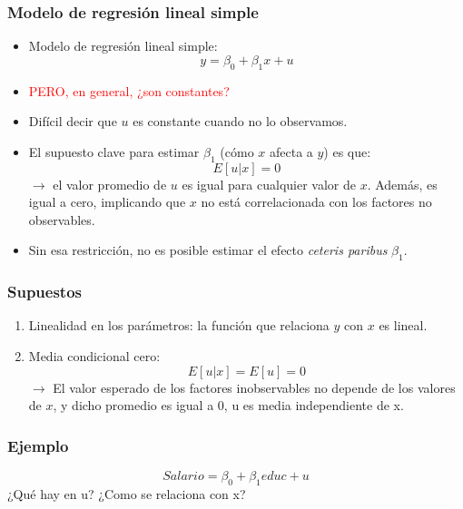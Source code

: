 \documentclass{beamer}
\begin{document}
\begin{frame}
	\frametitle{Modelo de regresión lineal simple} %
    \begin{itemize}
        \item Modelo de regresión lineal simple:
        \begin{equation}
            y = \beta_0 + \beta_1 x + u \tag{2}
        \end{equation}
        \item \textcolor{red}{PERO, en general, ¿son constantes?}
        \item Difícil decir que $u$ es constante cuando no lo observamos.
        \item El supuesto clave para estimar $\beta_1$ (cómo $x$ afecta a $y$) es que:
        \begin{equation*}
            E[u|x] = 0
        \end{equation*}
        $\rightarrow$ el valor promedio de $u$ es igual para cualquier valor de $x$. Además, es igual a cero, implicando que $x$ no está correlacionada con los factores no observables.
         \item Sin esa restricción, no es posible estimar el efecto \textit{ceteris paribus} $\beta_1$.
    \end{itemize}
\end{frame}
\begin{frame}
	\frametitle{Supuestos} %
\begin{enumerate}
  \item Linealidad en los parámetros: la función que relaciona $y$ con $x$ es lineal.
  \item Media condicional cero: 
  \begin{equation*}
  E[u|x] = E[u] = 0
  \end{equation*}  
  $\rightarrow$ El valor esperado de los factores inobservables no depende de los valores de $x$, y dicho promedio es igual a 0, {\color{blue} u es media independiente de x.}
\end{enumerate}
\end{frame}	
\begin{frame}
	\frametitle{Ejemplo} %
   \begin{equation*}
    Salario = \beta_0 + \beta_1 educ + u
  \end{equation*}
¿Qu\'e hay en u? ¿Como se relaciona con x?
\end{frame}	
\end{document}
